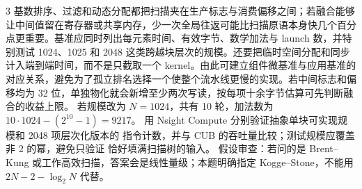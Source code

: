 \begin{solutionexercise}{3}
基数排序、过滤和动态分配都把扫描夹在生产标志与消费偏移之间；若融合能够让中间值留在寄存器或共享内存，少一次全局往返可能比扫描原语本身快几个百分点更重要。基准应同时列出每元素时间、有效字节、数学加法与 launch 数，并特别测试 1024、1025 和 2048 这类跨越块层次的规模。还要把临时空间分配和同步计入端到端时间，而不是只截取一个 kernel。由此可建立组件微基准与应用基准的对应关系，避免为了孤立排名选择一个使整个流水线更慢的实现。若中间标志和偏移均为 32 位，单独物化就会新增至少两次写读，按每项十余字节估算可先判断融合的收益上限。
\variantheading 若规模改为 $N=1024$，共有 10 轮，加法数为
$10\cdot1024-(2^{10}-1)=\boxed{9217}$。
\practiceheading 用 Nsight Compute 分别验证抽象单块可实现规模和 2048 项层次化版本的
指令计数，并与 CUB  的吞吐量比较；测试规模应覆盖非 2 的幂，避免只验证
恰好填满扫描树的输入。
假设审查：若问的是 Brent--Kung 或工作高效扫描，答案会是线性量级；本题明确指定
Kogge--Stone，不能用 $2N-2-\log_2N$ 代替。
\end{solutionexercise}

